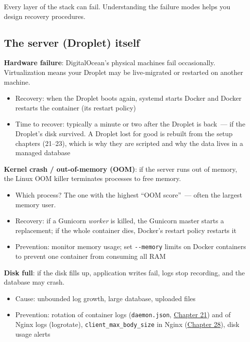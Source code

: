 Every layer of the stack can fail. Understanding the failure modes helps you design recovery procedures.

\subsection*{The server (Droplet) itself}\label{37-reliability:the-server-droplet-itself}

\textbf{Hardware failure}: DigitalOcean's physical machines fail occasionally. Virtualization means your Droplet may be live-migrated or restarted on another machine.

\begin{itemize}
\tightlist
\item
  Recovery: when the Droplet boots again, systemd starts Docker and Docker restarts the container (its restart policy)
\item
  Time to recover: typically a minute or two after the Droplet is back~--- if the Droplet's disk survived. A Droplet lost for good is rebuilt from the setup chapters (21--23), which is why they are scripted and why the data lives in a managed database
\end{itemize}

\noindent{}\textbf{Kernel crash / out-of-memory (OOM)}: if the server runs out of memory, the Linux OOM killer terminates processes to free memory.

\begin{itemize}
\tightlist
\item
  Which process? The one with the highest ``OOM score''~--- often the largest memory user.
\item
  Recovery: if a Gunicorn \emph{worker} is killed, the Gunicorn master starts a replacement; if the whole container dies, Docker's restart policy restarts it
\item
  Prevention: monitor memory usage; set \texttt{-\/-memory} limits on Docker containers to prevent one container from consuming all RAM
\end{itemize}

\noindent{}\textbf{Disk full}: if the disk fills up, application writes fail, logs stop recording, and the database may crash.

\begin{itemize}
\tightlist
\item
  Cause: unbounded log growth, large database, uploaded files
\item
  Prevention: rotation of container logs (\texttt{daemon.json}, \hyperref[ch:21-system-setup]{Chapter 21}) and of Nginx logs (logrotate), \texttt{client\_max\_body\_size} in Nginx (\hyperref[ch:28-traffic-routing]{Chapter 28}), disk usage alerts
\end{itemize}

